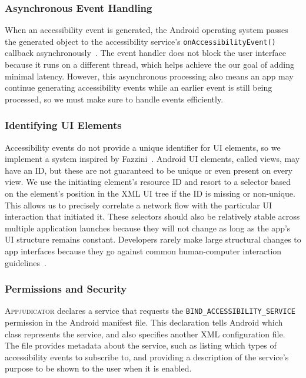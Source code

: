 
\subsubsection{Asynchronous Event Handling}
\label{sec:asynchronous-event-handling}

When an accessibility event is generated, the Android operating system passes
the generated object to the accessibility service's
\texttt{onAccessibilityEvent()} callback
asynchronously~\cite{googledevelopers2020}. The event handler does not block the
user interface because it runs on a different thread, which helps achieve the
our goal of adding minimal latency. However, this asynchronous processing also
means an app may continue generating accessibility events while an earlier event
is still being processed, so we must make sure to handle events efficiently.

\subsubsection{Identifying UI Elements}
\label{sec:identifying-ui-elements}

Accessibility events do not provide a unique identifier for UI elements, so we
implement a system inspired by Fazzini~\etal \cite{fazzini2017}. Android UI
elements, called views, may have an ID, but these are not guaranteed to be
unique or even present on every view. We use the initiating element's resource
ID and resort to a selector based on the element's position in the XML UI tree
if the ID is missing or non-unique. This allows us to precisely correlate a
network flow with the particular UI interaction that initiated it. These
selectors should also be relatively stable across multiple application launches
because they will not change as long as the app's UI structure remains constant.
Developers rarely make large structural changes to app interfaces because they
go against common human-computer interaction guidelines~\cite{norman2013}.


\subsubsection{Permissions and Security}
\label{sec:accessibility-permissions}

\textsc{Appjudicator} declares a service that requests the
\texttt{BIND\_ACCESSIBILITY\_SERVICE} permission in the Android manifest file.
This declaration tells Android which class represents the service, and also
specifies another XML configuration file.  The file provides metadata about the
service, such as listing which types of accessibility events to subscribe to,
and providing a description of the service's purpose to be shown to the user
when it is enabled.

